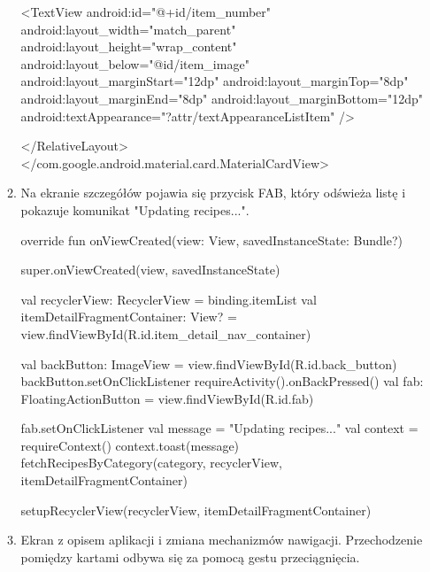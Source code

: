 \documentclass{article}
\begin{document}
\begin{enumerate}
\begin{enumerate}
\begin{mylisting}
        <TextView
            android:id="@+id/item_number"
            android:layout_width="match_parent"
            android:layout_height="wrap_content"
            android:layout_below="@id/item_image"
            android:layout_marginStart="12dp"
            android:layout_marginTop="8dp"
            android:layout_marginEnd="8dp"
            android:layout_marginBottom="12dp"
            android:textAppearance="?attr/textAppearanceListItem" />

    </RelativeLayout>
</com.google.android.material.card.MaterialCardView>
\end{mylisting}

    \newpage
    \item Na ekranie szczegółów pojawia się przycisk FAB, który odświeża listę 
    i pokazuje komunikat "Updating recipes...".
    
    \begin{mylisting}
override fun onViewCreated(view: View, savedInstanceState: Bundle?) {
    super.onViewCreated(view, savedInstanceState)

    val recyclerView: RecyclerView = binding.itemList
    val itemDetailFragmentContainer: View? = view.findViewById(R.id.item_detail_nav_container)

    val backButton: ImageView = view.findViewById(R.id.back_button)
    backButton.setOnClickListener {
        requireActivity().onBackPressed()
    }
    val fab: FloatingActionButton = view.findViewById(R.id.fab)

    fab.setOnClickListener {
        val message = "Updating recipes..."
        val context = requireContext()
        context.toast(message)
        fetchRecipesByCategory(category, recyclerView, itemDetailFragmentContainer)
    }

    setupRecyclerView(recyclerView, itemDetailFragmentContainer)
}
    \end{mylisting}

    \newpage
    \item Ekran z opisem aplikacji i zmiana mechanizmów nawigacji.
    Przechodzenie pomiędzy kartami odbywa się za pomocą gestu przeciągnięcia.
    

\end{enumerate}
\end{enumerate}
\end{document}
